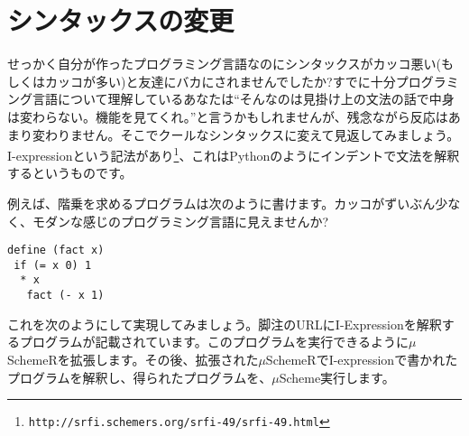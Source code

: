 \section{シンタックスの変更}
せっかく自分が作ったプログラミング言語なのにシンタックスがカッコ悪い(もしくはカッコが多い)と友達にバカにされませんでしたか?すでに十分プログラミング言語について理解しているあなたは“そんなのは見掛け上の文法の話で中身は変わらない。機能を見てくれ。”と言うかもしれませんが、残念ながら反応はあまり変わりません。そこでクールなシンタックスに変えて見返してみましょう。
I-expressionという記法があり\footnote{{\tt http://srfi.schemers.org/srfi-49/srfi-49.html}}、これはPythonのようにインデントで文法を解釈するというものです。 

例えば、階乗を求めるプログラムは次のように書けます。カッコがずいぶん少なく、モダンな感じのプログラミング言語に見えませんか?

\begin{lstlisting}
define (fact x)
 if (= x 0) 1
  * x
   fact (- x 1)
\end{lstlisting}

これを次のようにして実現してみましょう。脚注のURLにI-Expressionを解釈するプログラムが記載されています。このプログラムを実行できるように$\mu$SchemeRを拡張します。その後、拡張された$\mu$SchemeRでI-expressionで書かれたプログラムを解釈し、得られたプログラムを、$\mu$Scheme実行します。

